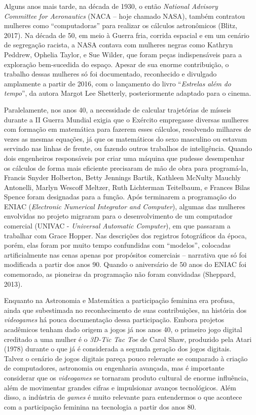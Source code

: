 Alguns anos mais tarde, na década de 1930, o então \textit{National Advisory Committee for Aeronautics} (NACA – hoje chamado NASA), também contratou mulheres como “computadoras” para realizar os cálculos astronômicos (Blitz, 2017). Na década de 50, em meio à Guerra fria, corrida espacial e em um cenário de segregação racista, a NASA contava com mulheres negras como Kathryn Peddrew, Ophelia Taylor, e Sue Wilder, que foram peças indispensáveis para a exploração bem-sucedida do espaço. Apesar de sua enorme contribuição, o trabalho dessas mulheres só foi documentado, reconhecido e divulgado amplamente a partir de 2016, com o lançamento do livro “\textit{Estrelas além do tempo}”, da autora Margot Lee Shetterly, posteriormente adaptado para o cinema.

Paralelamente, nos anos 40, a necessidade de calcular trajetórias de mísseis durante a II Guerra Mundial exigia que o Exército empregasse diversas mulheres com formação em matemática para fazerem esses cálculos, resolvendo milhares de vezes as mesmas equações, já que os matemáticos do sexo masculino ou estavam servindo nas linhas de frente, ou fazendo outros trabalhos de inteligência. Quando dois engenheiros responsáveis por criar uma máquina que pudesse desempenhar os cálculos de forma mais eficiente precisaram de mão de obra para programá-la, Francis Snyder Holberton, Betty Jennings Bartik, Kathleen McNulty Mauchly Antonelli, Marlyn Wescoff Meltzer, Ruth Lichterman Teitelbaum, e Frances Bilas Spence foram designadas para a função. Após terminarem a programação do ENIAC (\textit{Electronic Numerical Integrator and Computer}), algumas das mulheres envolvidas no projeto migraram para o desenvolvimento de um computador comercial (UNIVAC - \textit{Universal Automatic Computer}), em que passaram a trabalhar com Grace Hopper. Nas descrições dos registros fotográficos da época, porém, elas foram por muito tempo confundidas com “modelos”, colocadas artificialmente nas cenas apenas por propósitos comerciais – narrativa que só foi modificada a partir dos anos 90. Quando o aniversário de 50 anos do ENIAC foi comemorado, as pioneiras da programação não foram convidadas (Sheppard, 2013).

Enquanto na Astronomia e Matemática a participação feminina era profusa, ainda que subestimada no reconhecimento de suas contribuições, na história dos \textit{videogames} há pouca documentação dessa participação. Embora projetos acadêmicos tenham dado origem a jogos já nos anos 40, o primeiro jogo digital creditado a uma mulher é o \textit{3D-Tic Tac Toe} de Carol Shaw, produzido pela Atari (1978) durante o que já é considerada a segunda geração dos jogos digitais. Talvez o cenário de jogos digitais pareça pouco relevante se comparado à criação de computadores, astronomia ou engenharia avançada, mas é importante considerar que os \textit{videogames} se tornaram produto cultural de enorme influência, além de movimentar grandes cifras e impulsionar avanços tecnológicos. Além disso, a indústria de \textit{games} é muito relevante para entendermos o que acontece com a participação feminina na tecnologia a partir dos anos 80.

